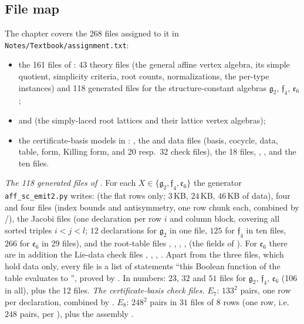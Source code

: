 \subsection{File map}
The chapter covers the 268 files assigned to it in \texttt{Notes/Textbook/assignment.txt}:
\begin{itemize}
\item the 161 files of : 43 theory files (the general affine vertex algebra, its simple quotient,
  simplicity criteria, root counts, normalizations, the per-type instances) and 118 generated files for the structure-constant algebras
  $\mathfrak g_2$, $\mathfrak f_4$, $\mathfrak e_6$;
\item {} and 
  (the simply-laced root lattices and their lattice vertex algebras);
\item the certificate-basis models in : , the
   and  data files (basis, cocycle, data, table, form, Killing form, and 20 resp.\ 32 
  check files), the 18  files, , ,  and the ten
   files.
\end{itemize}
\emph{The 118 generated files of .} For each $X\in\{\mathfrak g_2,\mathfrak f_4,\mathfrak e_6\}$ the generator
\texttt{aff\_sc\_emit2.py} writes:  (the flat rows only; $3$\,KB, $24$\,KB, $46$\,KB of data), four  and
four  files (index bounds and antisymmetry, one row chunk each, combined by /),
the Jacobi files  (one declaration  per row $i$ and column block, covering all sorted triples
$i<j<l$; $12$ declarations for $\mathfrak g_2$ in one file, $125$ for $\mathfrak f_4$ in ten files, $266$ for $\mathfrak e_6$ in 29 files), and the
root-table files , , , ,  (the fields of ). For
$\mathfrak e_6$ there are in addition the Lie-data check files , ,
, . Apart from the three  files, which hold data only, every
file is a list of statements ``this Boolean function of the table evaluates to '', proved by . In numbers:
$23$, $32$ and $51$ files for $\mathfrak g_2$, $\mathfrak f_4$, $\mathfrak e_6$ (106 in all), plus the 12  files.
\emph{The certificate-basis check files.} $E_7$: $133^2$ pairs, one row per declaration, combined by . $E_8$: $248^2$ pairs in
$31$ files of $8$ rows (one row, i.e.\ $248$ pairs, per ), plus the assembly .

